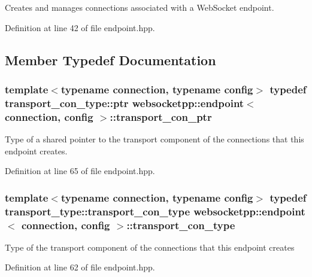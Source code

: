 Creates and manages connections associated with a Web\+Socket endpoint. 

Definition at line 42 of file endpoint.\+hpp.



\subsection{Member Typedef Documentation}
\subsubsection[{\texorpdfstring{transport\+\_\+con\+\_\+ptr}{transport\_con\_ptr}}]{\setlength{\rightskip}{0pt plus 5cm}template$<$typename connection, typename config$>$ typedef {\bf transport\+\_\+con\+\_\+type\+::ptr} {\bf websocketpp\+::endpoint}$<$ {\bf connection}, {\bf config} $>$\+::{\bf transport\+\_\+con\+\_\+ptr}}\hypertarget{classwebsocketpp_1_1endpoint_a22be3833280c548d724298eba0f00b2a}{}\label{classwebsocketpp_1_1endpoint_a22be3833280c548d724298eba0f00b2a}
Type of a shared pointer to the transport component of the connections that this endpoint creates. 

Definition at line 65 of file endpoint.\+hpp.

\subsubsection[{\texorpdfstring{transport\+\_\+con\+\_\+type}{transport\_con\_type}}]{\setlength{\rightskip}{0pt plus 5cm}template$<$typename connection, typename config$>$ typedef {\bf transport\+\_\+type\+::transport\+\_\+con\+\_\+type} {\bf websocketpp\+::endpoint}$<$ {\bf connection}, {\bf config} $>$\+::{\bf transport\+\_\+con\+\_\+type}}\hypertarget{classwebsocketpp_1_1endpoint_aaec9d745cafcee505c63efff421e3dff}{}\label{classwebsocketpp_1_1endpoint_aaec9d745cafcee505c63efff421e3dff}
Type of the transport component of the connections that this endpoint creates 

Definition at line 62 of file endpoint.\+hpp.




